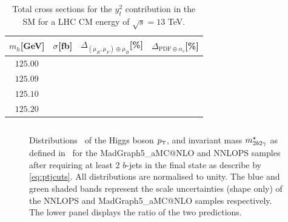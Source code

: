 \documentclass[11pt,a4paper]{article}
\begin{document}
\begin{table}[ht!]
\begin{center}%
\begin{small}%
\begin{tabular}{cccc}%
$m_h$[GeV] & $\sigma^{}$[fb] & $\Delta_{\left(\mu_{R},\mu_{F}\right)\oplus\mu_{B}}$[\%] & $\Delta_{\mathrm{PDF}\oplus\alpha_s}$[\%]  \\\hline
$125.00$ \\
$125.09$\\
$125.10$  \\
$125.20$ \\
\end{tabular}%
\end{small}%
\end{center}%
\caption{Total \bbH{} cross sections for the $y_t^2$ contribution in the SM for a LHC CM energy of $\sqrt{s}=13$ TeV.}
\label{tab:bbHyt13}
\end{table}




\begin{figure}[t!]
\begin{center}
\begin{tabular}{cc}
\end{tabular}
\vspace*{1ex}
\caption{Distributions~ of the Higgs boson $\pt$, and invariant mass $m_{2b2\gamma}^{\star}$ as defined in~  for the {\sc MadGraph5\_aMC@NLO} and {\sc NNLOPS} samples after requiring at least 2 $b$-jets in the final state as describe by \eqref{eq:ptjcuts}. All distributions are normalised to unity. The blue and green shaded bands represent the scale uncertainties (shape only) of the {\sc NNLOPS} and {\sc MadGraph5\_aMC@NLO} samples respectively. The lower panel displays the ratio of the two predictions.\label{fig:4fsNNLOPS}}
\end{center}
\end{figure}
\end{document}
